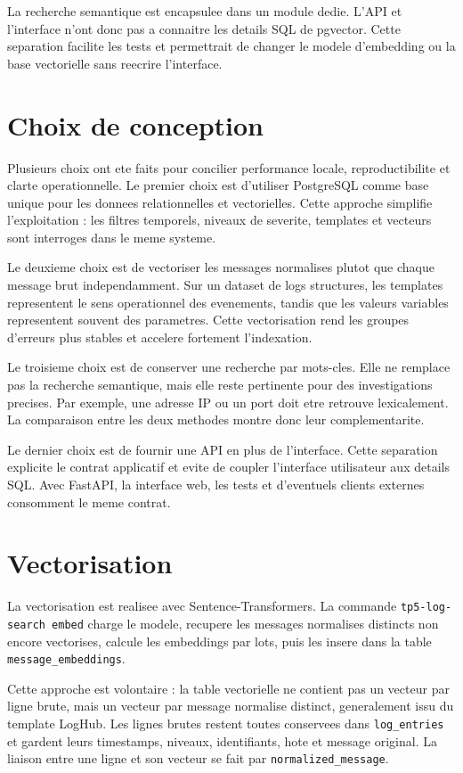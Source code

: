 \documentclass[12pt,a4paper]{article}
\begin{document}
La recherche semantique est encapsulee dans un module dedie. L'API et l'interface n'ont donc pas a
connaitre les details SQL de pgvector. Cette separation facilite les tests et permettrait de changer
le modele d'embedding ou la base vectorielle sans reecrire l'interface.

\section{Choix de conception}

Plusieurs choix ont ete faits pour concilier performance locale, reproductibilite et clarte
operationnelle. Le premier choix est d'utiliser PostgreSQL comme base unique pour les donnees
relationnelles et vectorielles. Cette approche simplifie l'exploitation : les filtres temporels,
niveaux de severite, templates et vecteurs sont interroges dans le meme systeme.

Le deuxieme choix est de vectoriser les messages normalises plutot que chaque message brut
independamment. Sur un dataset de logs structures, les templates representent le sens operationnel
des evenements, tandis que les valeurs variables representent souvent des parametres. Cette
vectorisation rend les groupes d'erreurs plus stables et accelere fortement l'indexation.

Le troisieme choix est de conserver une recherche par mots-cles. Elle ne remplace pas la recherche
semantique, mais elle reste pertinente pour des investigations precises. Par exemple, une adresse IP
ou un port doit etre retrouve lexicalement. La comparaison entre les deux methodes montre donc leur
complementarite.

Le dernier choix est de fournir une API en plus de l'interface. Cette separation explicite le
contrat applicatif et evite de coupler l'interface utilisateur aux details SQL. Avec FastAPI, la
interface web, les tests et d'eventuels clients externes consomment le meme contrat.

\section{Vectorisation}

La vectorisation est realisee avec Sentence-Transformers. La commande
\texttt{tp5-log-search embed} charge le modele, recupere les messages normalises distincts non encore
vectorises, calcule les embeddings par lots, puis les insere dans la table \texttt{message\_embeddings}.

Cette approche est volontaire : la table vectorielle ne contient pas un vecteur par ligne brute,
mais un vecteur par message normalise distinct, generalement issu du template LogHub. Les lignes
brutes restent toutes conservees dans \texttt{log\_entries} et gardent leurs timestamps, niveaux,
identifiants, hote et message original. La liaison entre une ligne et son vecteur se fait par
\texttt{normalized\_message}.
\end{document}
